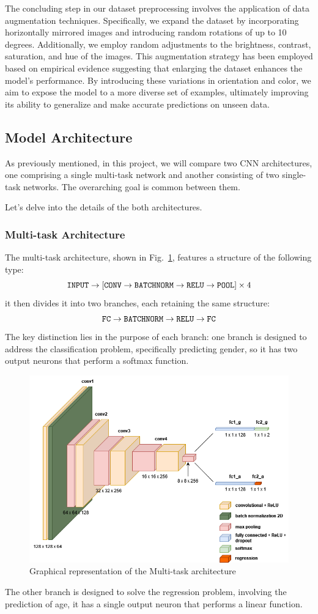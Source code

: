 The concluding step in our dataset preprocessing involves the application
of data augmentation techniques. Specifically, we expand the dataset
by incorporating horizontally mirrored images and introducing random
rotations of up to 10 degrees. Additionally, we employ random adjustments
to the brightness, contrast, saturation, and hue of the images.
This augmentation strategy has been employed based on empirical
evidence suggesting that enlarging the dataset enhances the model's
performance. By introducing these variations in orientation and color,
we aim to expose the model to a more diverse set of examples,
ultimately improving its ability to generalize and make accurate
predictions on unseen data.

\subsection{Model Architecture} \label{sec:model}

As previously mentioned, in this project, we will compare two
CNN architectures, one comprising a single multi-task
network and another consisting of two single-task networks.
The overarching goal is common between them.

Let's delve into the details of the both architectures.

\subsubsection{Multi-task Architecture} \label{sec:multi}

The multi-task architecture, shown in Fig.~\ref{cnn1},
features a structure of the following type:
$$ \text{\texttt{INPUT}} \rightarrow [\text{\texttt{CONV}} \rightarrow \text{\texttt{BATCHNORM}} \rightarrow \text{\texttt{RELU}} \rightarrow \text{\texttt{POOL}}] \times 4$$
it then divides it into two branches, each retaining the same structure:
$$ \text{\texttt{FC}} \rightarrow \text{\texttt{BATCHNORM}} \rightarrow \text{\texttt{RELU}} \rightarrow \text{\texttt{FC}}$$
The key distinction lies in the purpose of each branch:
one branch is designed to address the classification problem,
specifically predicting gender,
so it has two output neurons that perform a softmax function.
\begin{figure}[htbp]
    \centerline{\includegraphics[width=.5\textwidth]{images/shared_cnn.png}}
    \caption{Graphical representation of the Multi-task architecture}
    \label{cnn1}
\end{figure}
The other branch is designed to solve the regression problem,
involving the prediction of age,
it has a single output neuron that performs a linear function.

